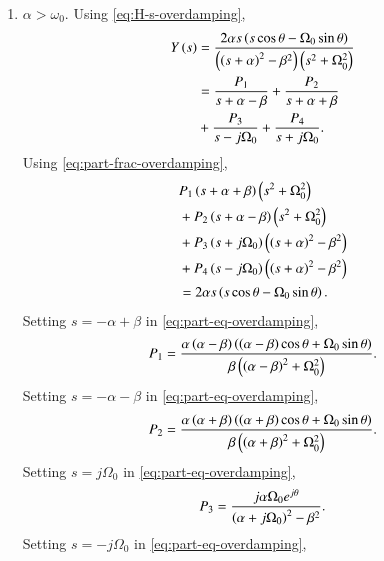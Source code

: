 \documentclass[journal,12pt,twocolumn]{IEEEtran}
\begin{document}
\begin{enumerate}[label=\theenumi.]
\begin{enumerate}
        \item \(\alpha > \omega_0\). Using \eqref{eq:H-s-overdamping},
        \begin{align}
            Y\left(s\right) &= \frac{2\alpha{}s\left(s\cos\theta-\Omega_0\sin\theta\right)}{\left(\left(s+\alpha\right)^2-\beta^2\right)\left(s^2+\Omega_0^2\right)} \\
                      &= \frac{P_1}{s+\alpha-\beta} + \frac{P_2}{s+\alpha+\beta} \nonumber \\
                      &+ \frac{P_3}{s-j\Omega_0} + \frac{P_4}{s+j\Omega_0}.
                      \label{eq:part-frac-overdamping}
        \end{align}
        Using \eqref{eq:part-frac-overdamping},
        \begin{align}
            &P_1\left(s+\alpha+\beta\right)\left(s^2+\Omega_0^2\right) \nonumber \\
            &+ P_2\left(s+\alpha-\beta\right)\left(s^2+\Omega_0^2\right) \nonumber \\
            &+ P_3\left(s+j\Omega_0\right)\left(\left(s+\alpha\right)^2-\beta^2\right) \nonumber \\
            &+ P_4\left(s-j\Omega_0\right)\left(\left(s+\alpha\right)^2-\beta^2\right) \nonumber \\
            &= 2\alpha{}s\left(s\cos\theta-\Omega_0\sin\theta\right).
            \label{eq:part-eq-overdamping}
        \end{align}
        Setting \(s = -\alpha+\beta\) in \eqref{eq:part-eq-overdamping},
        \begin{equation}
            P_1 = \frac{\alpha\left(\alpha-\beta\right)\left(\left(\alpha-\beta\right)\cos\theta+\Omega_0\sin\theta\right)}{\beta\left(\left(\alpha-\beta\right)^2+\Omega_0^2\right)}.
            \label{eq:P-1-def-overdamping}
        \end{equation}
        Setting \(s = -\alpha-\beta\) in \eqref{eq:part-eq-overdamping},
        \begin{equation}
            P_2 = \frac{\alpha\left(\alpha+\beta\right)\left(\left(\alpha+\beta\right)\cos\theta+\Omega_0\sin\theta\right)}{\beta\left(\left(\alpha+\beta\right)^2+\Omega_0^2\right)}.
            \label{eq:P-2-def-overdamping}
        \end{equation}
        Setting \(s = j\Omega_0\) in \eqref{eq:part-eq-overdamping},
        \begin{equation}
            P_3 = \frac{j\alpha\Omega_0e^{j\theta}}{\left(\alpha+j\Omega_0\right)^2-\beta^2}.
            \label{eq:P-3-def-overdamping}
        \end{equation}
        Setting \(s = -j\Omega_0\) in \eqref{eq:part-eq-overdamping},

\end{enumerate}
\end{enumerate}
\end{document}
